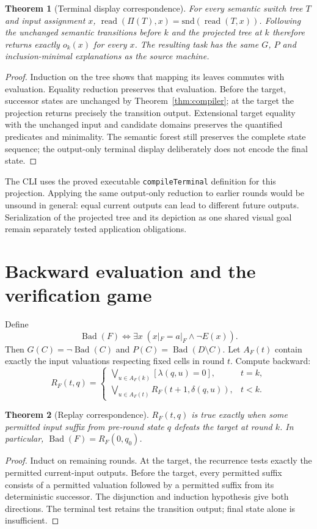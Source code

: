 \documentclass[11pt]{article}
\newtheorem{theorem}{Theorem}
\newcommand{\Bad}{\operatorname{Bad}}
\begin{document}
\begin{theorem}[Terminal display correspondence]\label{thm:display}
For every semantic switch tree $T$ and input assignment $x$,
$\operatorname{read}(\Pi(T),x)=\mathrm{snd}(\operatorname{read}(T,x))$.
Following the unchanged semantic transitions before $k$ and the projected tree
at $k$ therefore returns exactly $o_k(x)$ for every $x$. The resulting task has
the same $G$, $P$ and inclusion-minimal explanations as the source machine.
\end{theorem}
\begin{proof}
Induction on the tree shows that mapping its leaves commutes with evaluation.
Equality reduction preserves that evaluation. Before the target, successor
states are unchanged by Theorem~\ref{thm:compiler}; at the target the projection
returns precisely the transition output. Extensional target equality with the
unchanged input and candidate domains preserves the quantified predicates and
minimality. The semantic forest still preserves the complete state sequence;
the output-only terminal display deliberately does not encode the final state.
\end{proof}

The CLI uses the proved executable \texttt{compileTerminal} definition for
this projection. Applying the same output-only reduction to earlier rounds
would be unsound in general: equal current outputs can lead to different
future outputs. Serialization of the projected tree and its depiction as one
shared visual goal remain separately tested application obligations.

\section{Backward evaluation and the verification game}
Define
\[
\Bad(F)\iff \exists x\;(x|_F=a|_F\land\neg E(x)).
\]
Then $G(C)=\neg\Bad(C)$ and $P(C)=\Bad(D\setminus C)$.
Let $A_F(t)$ contain exactly the input valuations respecting fixed cells in
round $t$. Compute backward:
\[
R_F(t,q)=
\begin{cases}
\displaystyle\bigvee_{u\in A_F(k)}[\lambda(q,u)=0], & t=k,\\[3pt]
\displaystyle\bigvee_{u\in A_F(t)}R_F(t+1,\delta(q,u)), & t<k.
\end{cases}
\]
\begin{theorem}[Replay correspondence]\label{thm:replay}
$R_F(t,q)$ is true exactly when some permitted input suffix from pre-round state
$q$ defeats the target at round $k$. In particular,
$\Bad(F)=R_F(0,q_0)$.
\end{theorem}
\begin{proof}
Induct on remaining rounds. At the target, the recurrence tests exactly the
permitted current-input outputs. Before the target, every permitted suffix
consists of a permitted valuation followed by a permitted suffix from its
deterministic successor. The disjunction and induction hypothesis give both
directions. The terminal test retains the transition output; final state alone
is insufficient.
\end{proof}
\end{document}
